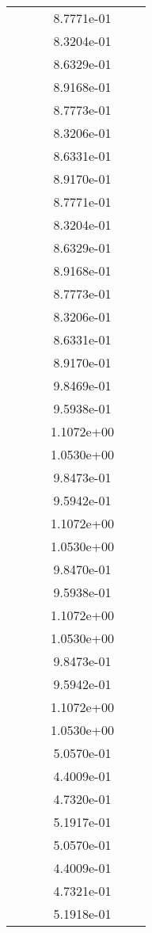 \begin{xltabular}{\textwidth}{r|rS[table-format=1.3e+2]S[table-format=1.4e+2]S[table-format=1.4e+2]S[table-format=-1.5]}
&  &  & 8.7771e-01 & & \\
&  &  & 8.3204e-01 & & \\
&  &  & 8.6329e-01 & & \\
&  &  & 8.9168e-01 & & \\
&  &  & 8.7773e-01 & & \\
&  &  & 8.3206e-01 & & \\
&  &  & 8.6331e-01 & & \\
&  &  & 8.9170e-01 & & \\
&  &  & 8.7771e-01 & & \\
&  &  & 8.3204e-01 & & \\
&  &  & 8.6329e-01 & & \\
&  &  & 8.9168e-01 & & \\
&  &  & 8.7773e-01 & & \\
&  &  & 8.3206e-01 & & \\
&  &  & 8.6331e-01 & & \\
&  &  & 8.9170e-01 & & \\
&  &  & 9.8469e-01 & & \\
&  &  & 9.5938e-01 & & \\
&  &  & 1.1072e+00 & & \\
&  &  & 1.0530e+00 & & \\
&  &  & 9.8473e-01 & & \\
&  &  & 9.5942e-01 & & \\
&  &  & 1.1072e+00 & & \\
&  &  & 1.0530e+00 & & \\
&  &  & 9.8470e-01 & & \\
&  &  & 9.5938e-01 & & \\
&  &  & 1.1072e+00 & & \\
&  &  & 1.0530e+00 & & \\
&  &  & 9.8473e-01 & & \\
&  &  & 9.5942e-01 & & \\
&  &  & 1.1072e+00 & & \\
&  &  & 1.0530e+00 & & \\
&  &  & 5.0570e-01 & & \\
&  &  & 4.4009e-01 & & \\
&  &  & 4.7320e-01 & & \\
&  &  & 5.1917e-01 & & \\
&  &  & 5.0570e-01 & & \\
&  &  & 4.4009e-01 & & \\
&  &  & 4.7321e-01 & & \\
&  &  & 5.1918e-01 & & \\

\end{xltabular}
